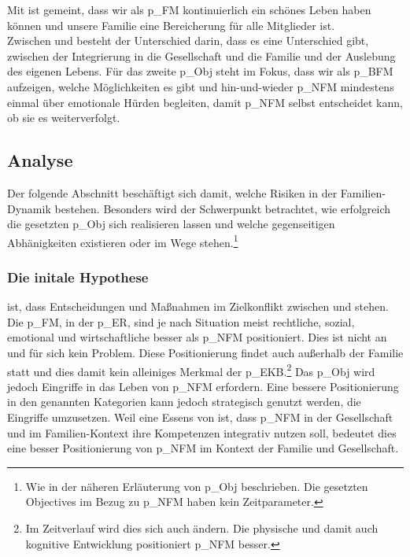 Mit \NFMOTwo ist gemeint, dass wir als \gls{p_FM} kontinuierlich ein schönes Leben haben können und unsere Familie eine Bereicherung für alle Mitglieder ist.\\

Zwischen \NFMOOne und \NFMOThree besteht der Unterschied darin, dass es eine Unterschied gibt, zwischen der Integrierung in die Gesellschaft und die Familie und der Auslebung des eigenen Lebens. Für das zweite \gls{p_Obj} steht im Fokus, dass wir als \gls{p_BFM} aufzeigen, welche Möglichkeiten es gibt und hin-und-wieder \gls{p_NFM} mindestens einmal über emotionale Hürden begleiten, damit \gls{p_NFM} selbst entscheidet kann, ob sie es weiterverfolgt.

\subsection{Analyse} \label{sec:Risiko_EKB}
Der folgende Abschnitt beschäftigt sich damit, welche Risiken in der Familien-Dynamik bestehen. Besonders wird der Schwerpunkt betrachtet, wie erfolgreich die gesetzten \gls{p_Obj} sich realisieren lassen und welche gegenseitigen Abhänigkeiten existieren oder im Wege stehen.\footnote{
	Wie in der näheren Erläuterung von \gls{p_Obj} beschrieben. Die gesetzten Objectives im Bezug zu \gls{p_NFM} haben kein Zeitparameter.
}

\subsubsection{Die initale Hypothese} ist, dass Entscheidungen und Maßnahmen im Zielkonflikt zwischen \NFMOTwo und  stehen.\\

Die \gls{p_FM}, in der \gls{p_ER}, sind je nach Situation meist rechtliche, sozial, emotional und wirtschaftliche besser als \gls{p_NFM} positioniert. Dies ist nicht an und für sich kein Problem. Diese Positionierung findet auch außerhalb der Familie statt und dies damit kein alleiniges Merkmal der \gls{p_EKB}.\footnote{
	Im Zeitverlauf wird dies sich auch ändern. Die physische und damit auch kognitive Entwicklung positioniert \gls{p_NFM} besser.
}
Das \gls{p_Obj}  wird jedoch Eingriffe in das Leben von \gls{p_NFM} erfordern. Eine bessere Positionierung in den genannten Kategorien kann jedoch strategisch genutzt werden, die Eingriffe umzusetzen. Weil eine Essens von  ist, dass
\gls{p_NFM} in der Gesellschaft und im Familien-Kontext ihre Kompetenzen integrativ nutzen soll, bedeutet dies eine besser Positionierung von \gls{p_NFM} im Kontext der Familie und Gesellschaft.\\ 


